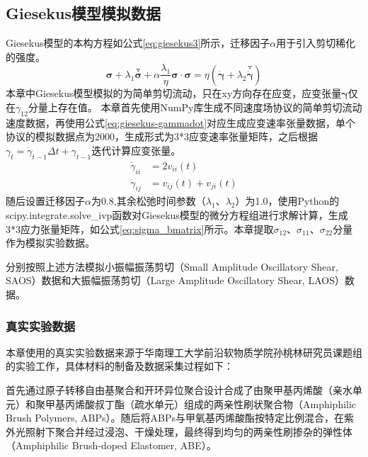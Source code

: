 \subsection{Giesekus模型模拟数据}
Giesekus模型的本构方程如公式\eqref{eq:giesekus3}所示，迁移因子$\alpha$用于引入剪切稀化的强度。
\begin{equation}
  \boldsymbol{\sigma} + \lambda_1 \stackrel{\triangledown}{\boldsymbol{\sigma}} + \alpha \frac{\lambda_1}{\eta} \boldsymbol{\sigma} \cdot \boldsymbol{\sigma} = \eta \left( \dot{\boldsymbol{\gamma}} + \lambda_2 \stackrel{\triangledown}{\dot{\boldsymbol{\gamma}}} \right) \label{eq:giesekus3}
\end{equation}
本章中Giesekus模型模拟的为简单剪切流动，只在xy方向存在应变，应变张量$\boldsymbol{\gamma}$仅在$\gamma_{12}$分量上存在值。
本章首先使用NumPy库生成不同速度场协议的简单剪切流动速度数据，再使用公式\eqref{eq:giesekus-gammadot}对应生成应变速率张量数据，单个协议的模拟数据点为2000，生成形式为3*3应变速率张量矩阵，之后根据$\gamma_{t}=\dot{\gamma}_{t-1}\Delta t+\gamma_{t-1}$迭代计算应变张量。
\begin{equation}
  \begin{aligned}
    \dot{\gamma}_{ii} & = 2 v_{ii}(t)           \\
    \dot{\gamma}_{ij} & = v_{ij}(t) + v_{ji}(t)
  \end{aligned} \label{eq:giesekus-gammadot}
\end{equation}
随后设置迁移因子$\alpha$为0.8,其余松弛时间参数（$\lambda_1$、$\lambda_2$）为1.0，使用Python的scipy.integrate.solve\_ivp函数对Giesekus模型的微分方程组进行求解计算，生成3*3应力张量矩阵，如公式\eqref{eq:sigma_bmatrix}所示。本章提取$\sigma_{12}$、$\sigma_{11}$、$\sigma_{22}$分量作为模拟实验数据。

分别按照上述方法模拟小振幅振荡剪切（Small Amplitude Oscillatory Shear, SAOS）数据和大振幅振荡剪切（Large Amplitude Oscillatory Shear, LAOS）数据。
\subsubsection{真实实验数据}
本章使用的真实实验数据来源于华南理工大学前沿软物质学院孙桃林研究员课题组的实验工作，具体材料的制备及数据采集过程如下：

首先通过原子转移自由基聚合和开环异位聚合设计合成了由聚甲基丙烯酸（亲水单元）和聚甲基丙烯酸叔丁酯（疏水单元）组成的两亲性刷状聚合物（Amphiphilic Brush Polymers, ABPs）。随后将ABPs与甲氧基丙烯酸酯按特定比例混合，在紫外光照射下聚合并经过浸泡、干燥处理，最终得到均匀的两亲性刷掺杂的弹性体（Amphiphilic Brush-doped Elastomer, ABE）。

